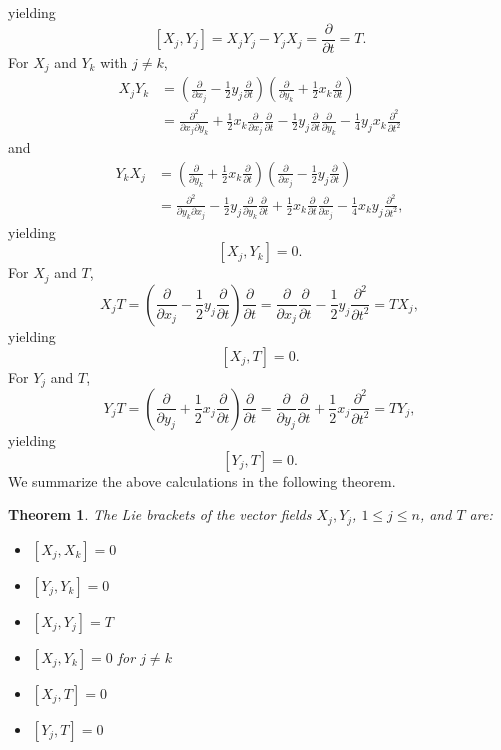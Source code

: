 \documentclass{article}
\newtheorem{theorem}{Theorem}
\theoremstyle{definition}
\begin{document}
yielding
\[
[X_j,Y_j]=X_jY_j-Y_jX_j = \frac{\partial}{\partial t} =T.
\]
For $X_j$ and $Y_k$ with $j \neq k$,
\begin{align*}
X_jY_k&=\left( \frac{\partial}{\partial x_j} - \frac{1}{2}y_j \frac{\partial}{\partial t}\right)
\left( \frac{\partial}{\partial y_k} + \frac{1}{2}x_k \frac{\partial}{\partial t}\right)\\
&=\frac{\partial^2}{\partial x_j \partial y_k} +\frac{1}{2}x_k \frac{\partial}{\partial x_j} \frac{\partial}{\partial t}
-\frac{1}{2}y_j \frac{\partial}{\partial t}  \frac{\partial}{\partial y_k} 
-\frac{1}{4} y_j x_k \frac{\partial^2}{\partial t^2}
\end{align*}
and
\begin{align*}
Y_k X_j&=\left( \frac{\partial}{\partial y_k} + \frac{1}{2}x_k \frac{\partial}{\partial t}\right)\left( \frac{\partial}{\partial x_j} - \frac{1}{2}y_j \frac{\partial}{\partial t}\right)\\
&=\frac{\partial^2}{\partial y_k \partial x_j} - \frac{1}{2} y_j \frac{\partial}{\partial y_k} \frac{\partial}{\partial t}
+\frac{1}{2}x_k \frac{\partial}{\partial t} \frac{\partial}{\partial x_j}
-\frac{1}{4} x_k y_j \frac{\partial^2}{\partial t^2},
\end{align*}
yielding
\[
[X_j,Y_k]=0.
\]
For $X_j$ and $T$,
\[
X_j T = \left(\frac{\partial}{\partial x_j} - \frac{1}{2}y_j \frac{\partial}{\partial t}\right)
\frac{\partial}{\partial t}
=\frac{\partial}{\partial x_j} \frac{\partial}{\partial t} - \frac{1}{2} y_j \frac{\partial^2}{\partial t^2}
=TX_j,
\]
yielding
\[
[X_j,T] = 0.
\]
For $Y_j$ and $T$, 
\[
Y_j T = \left(\frac{\partial}{\partial y_j} + \frac{1}{2}x_j \frac{\partial}{\partial t}\right) \frac{\partial}{\partial t}
=\frac{\partial}{\partial y_j} \frac{\partial}{\partial t} + \frac{1}{2} x_j \frac{\partial^2}{\partial t^2}=TY_j,
\]
yielding
\[
[Y_j,T]=0.
\]
We summarize the above calculations in the following theorem.

\begin{theorem}
The Lie brackets of the vector fields $X_j,Y_j$, $1 \leq j \leq n$, and $T$ are:
\begin{itemize}
\item $[X_j,X_k]=0$
\item $[Y_j,Y_k]=0$
\item $[X_j,Y_j]=T$
\item $[X_j,Y_k]=0$ for $j \neq k$
\item $[X_j,T]=0$
\item $[Y_j,T]=0$
\end{itemize}
\end{theorem}
\end{document}

